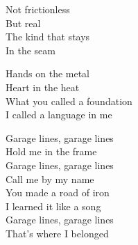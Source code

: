 \begin{lyrics}
Not frictionless\\
But real\\
The kind that stays\\
In the seam

Hands on the metal\\
Heart in the heat\\
What you called a foundation\\
I called a language in me

Garage lines, garage lines\\
Hold me in the frame\\
Garage lines, garage lines\\
Call me by my name\\
You made a road of iron\\
I learned it like a song\\
Garage lines, garage lines\\
That’s where I belonged
\end{lyrics}

